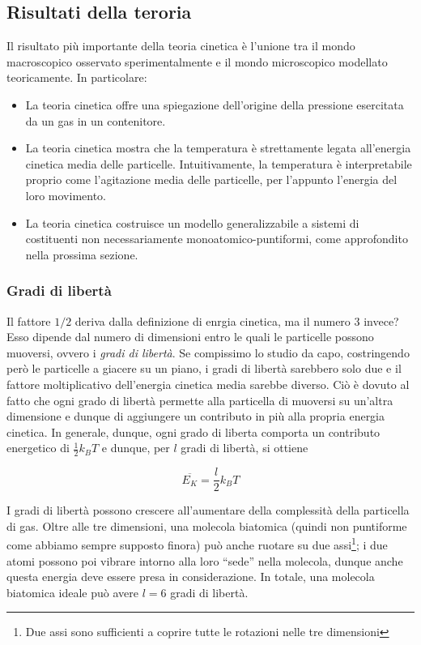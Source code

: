 \subsection*{Risultati della teroria}
Il risultato più importante della teoria cinetica è l'unione tra
il mondo macroscopico osservato sperimentalmente e il mondo microscopico
modellato teoricamente. In particolare:
\begin{itemize}
    \item La teoria cinetica offre una spiegazione dell'origine della
    pressione esercitata da un gas in un contenitore.

    \item La teoria cinetica mostra che la temperatura è strettamente
    legata all'energia cinetica media delle particelle. Intuitivamente,
    la temperatura è interpretabile proprio come l'agitazione media
    delle particelle, per l'appunto l'energia del loro movimento.

    \item La teoria cinetica costruisce un modello generalizzabile
    a sistemi di costituenti non necessariamente monoatomico-puntiformi,
    come approfondito nella prossima sezione.
\end{itemize}

\subsubsection*{Gradi di libertà}
Il fattore $1/2$ deriva dalla definizione di enrgia cinetica, ma
il numero $3$ invece? Esso dipende dal numero di dimensioni entro
le quali le particelle possono muoversi, ovvero i \textit{gradi di
libertà}. Se compissimo lo studio da capo, costringendo però le particelle
a giacere su un piano, i gradi di libertà sarebbero solo due e il fattore
moltiplicativo
dell'energia cinetica media sarebbe diverso. Ciò è dovuto al fatto
che ogni grado di libertà permette alla particella di muoversi su
un'altra dimensione e dunque di aggiungere un contributo in più alla
propria energia cinetica. In generale, dunque, ogni grado di
liberta comporta un contributo energetico di $\frac12k_BT$ e
dunque, per $l$ gradi di libertà, si ottiene

\[ \overline{E_K} = \frac{l}{2}k_BT \]

I gradi di libertà possono crescere all'aumentare della complessità
della particella di gas. Oltre alle tre dimensioni, una molecola
biatomica (quindi non puntiforme come abbiamo sempre supposto finora)
può anche ruotare su due assi\footnote{Due assi sono sufficienti a
coprire tutte le rotazioni nelle tre dimensioni}; i due atomi possono
poi vibrare intorno alla loro ``sede'' nella molecola, dunque anche
questa energia deve essere presa in considerazione. In totale, una
molecola biatomica ideale può avere $l = 6$ gradi di libertà.


